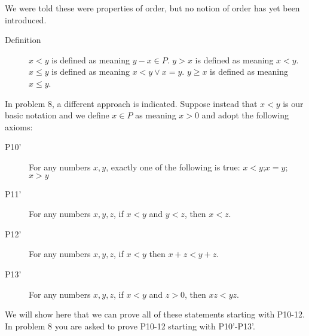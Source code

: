 \documentclass[12pt]{article}
\begin{document}
We were told these were properties of order, but no notion of order has yet been introduced.

\begin{description}

\item[Definition]  $x<y$ is defined as meaning $y-x \in P$.  $y>x$ is defined as meaning $x<y$.  $x\leq y$ is defined as meaning $x <y \vee x=y$.
$y \geq x$ is defined as meaning $x \leq y$.

\end{description}

In problem 8, a different approach is indicated.  Suppose instead that $x<y$ is our basic notation and we define $x \in P$ as meaning $x>0$
and adopt the following axioms:

\begin{description}

\item[P10']  For any numbers $x,y$, exactly one of the following is true:  $x<y$;$x=y$;$x>y$

\item[P11']  For any numbers $x,y,z$, if $x<y$ and $y<z$, then $x<z$.

\item[P12']  For any numbers $x,y,z$, if $x<y$ then $x+z<y+z$.

\item[P13']  For any numbers $x,y,z$, if $x<y$ and $z>0$, then $xz<yz$.

\end{description}

We will show here that we can prove all of these statements starting with P10-12.  In problem 8 you are asked to prove
P10-12 starting with P10'-P13'.
\end{document}

